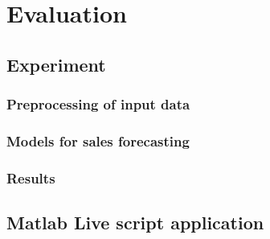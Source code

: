 
\chapter{Evaluation} \label{evaluation}
\section{Experiment} \label{sec:experiment}
\subsection{Preprocessing of input data} \label{subsec:preprocessing}
\subsection{Models for sales forecasting} \label{subsec:calculate_models}
\subsection{Results} \label{subsec:experimentResults}
\section{Matlab Live script application} \label{sec:livescript}
